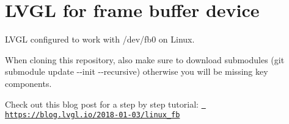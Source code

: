 \chapter{LVGL for frame buffer device}
\hypertarget{md__c_1_2_users_2kemik_2git_2lvgl__t113_2_r_e_a_d_m_e}{}\label{md__c_1_2_users_2kemik_2git_2lvgl__t113_2_r_e_a_d_m_e}
\label{md__c_1_2_users_2kemik_2git_2lvgl__t113_2_r_e_a_d_m_e_autotoc_md0}%
%
 LVGL configured to work with /dev/fb0 on Linux.

When cloning this repository, also make sure to download submodules ({\ttfamily git submodule update -\/-\/init -\/-\/recursive}) otherwise you will be missing key components.

Check out this blog post for a step by step tutorial\+: \href{https://blog.lvgl.io/2018-01-03/linux_fb}{\texttt{ https\+://blog.\+lvgl.\+io/2018-\/01-\/03/linux\+\_\+fb}} 
